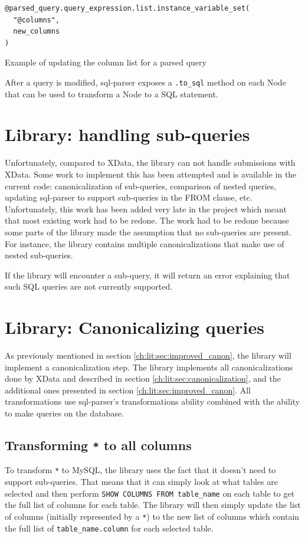 \begin{listing}
\begin{verbatim}
@parsed_query.query_expression.list.instance_variable_set(
  "@columns",
  new_columns
)
\end{verbatim}
\caption{Example of updating the column list for a parsed query}
\end{listing}

After a query is modified, sql-parser exposes a \texttt{.to_sql} method on each Node that can be used to transform a Node to a SQL statement.

\section{Library: handling sub-queries}

Unfortunately, compared to XData, the library can not handle submissions with XData. Some work to implement this has been attempted and is available in the current code: canonicalization of sub-queries, comparison of nested queries, updating sql-parser to support sub-queries in the FROM clause, etc. Unfortunately, this work has been added very late in the project which meant that most existing work had to be redone. The work had to be redone because some parts of the library made the assumption that no sub-queries are present. For instance, the library contains multiple canonicalizations that make use of nested sub-queries. 

If the library will encounter a sub-query, it will return an error explaining that such SQL queries are not currently supported.

\section{Library: Canonicalizing queries}

As previously mentioned in section \ref{ch:lit:sec:improved_canon}, the library will implement a canonicalization step. The library implements all canonicalizations done by XData and described in section \ref{ch:lit:sec:canonicalization}, and the additional ones presented in section \ref{ch:lit:sec:improved_canon}. All transformations use sql-parser's transformations ability combined with the ability to make queries on the database.

\subsection{Transforming \texttt{*} to all columns}
To transform \texttt{*} to MySQL, the library uses the fact that it doesn't need to support sub-queries. That means that it can simply look at what tables are selected and then perform \texttt{SHOW COLUMNS FROM table_name} on each table to get the full list of columns for each table. The library will then simply update the list of columns (initially represented by a \texttt{*}) to the new list of columns which contain the full list of \texttt{table\_name.column} for each selected table.

